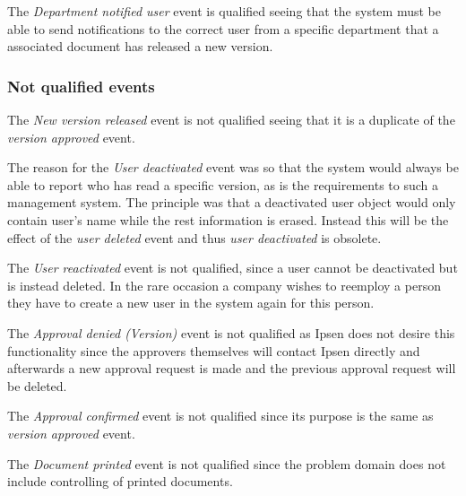 The \textit{Department notified user} event is qualified seeing that the system must be able to send notifications to the correct user from a specific department that a associated document has released a new version.

\subsubsection*{Not qualified events}

The \textit{New version released} event is not qualified seeing that it is a duplicate of the \textit{version approved} event.

The reason for the \textit{User deactivated} event was so that the system would always be able to report who has read a specific version, as is the requirements to such a management system.
The principle was that a deactivated user object would only contain user's name while the rest information is erased.
Instead this will be the effect of the \textit{user deleted} event and thus \textit{user deactivated} is obsolete.

The \textit{User reactivated} event is not qualified, since a user cannot be deactivated but is instead deleted. In the rare occasion a company wishes to reemploy a person they have to create a new user in the system again for this person.

The \textit{Approval denied (Version)} event is not qualified as Ipsen does not desire this functionality since the approvers themselves will contact Ipsen directly and afterwards a new approval request is made and the previous approval request will be deleted.

The \textit{Approval confirmed} event is not qualified since its purpose is the same as \textit{version approved} event.

The \textit{Document printed} event is not qualified since the problem domain does not include controlling of printed documents.

